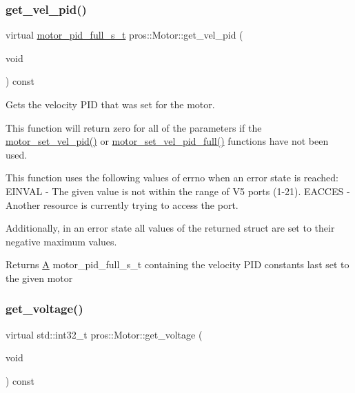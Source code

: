 \subsubsection{\texorpdfstring{get\_vel\_pid()}{get\_vel\_pid()}}
{\footnotesize\ttfamily virtual \mbox{\hyperlink{motors_8h_a0295cbf49f5c70c17b5fa962bd25febd}{motor\+\_\+pid\+\_\+full\+\_\+s\+\_\+t}} pros\+::\+Motor\+::get\+\_\+vel\+\_\+pid (\begin{DoxyParamCaption}\item[{void}]{ }\end{DoxyParamCaption}) const\hspace{0.3cm}{\ttfamily [virtual]}}



Gets the velocity P\+ID that was set for the motor. 

This function will return zero for all of the parameters if the \mbox{\hyperlink{motors_8h_a4255880d012ed0ec856f302536755d8a}{motor\+\_\+set\+\_\+vel\+\_\+pid()}} or \mbox{\hyperlink{motors_8h_acdec538d8f08e8b5946294f84f017e8e}{motor\+\_\+set\+\_\+vel\+\_\+pid\+\_\+full()}} functions have not been used.

This function uses the following values of errno when an error state is reached\+: E\+I\+N\+V\+AL -\/ The given value is not within the range of V5 ports (1-\/21). E\+A\+C\+C\+ES -\/ Another resource is currently trying to access the port.

Additionally, in an error state all values of the returned struct are set to their negative maximum values.

\begin{DoxyReturn}{Returns}
\mbox{\hyperlink{structA}{A}} motor\+\_\+pid\+\_\+full\+\_\+s\+\_\+t containing the velocity P\+ID constants last set to the given motor 
\end{DoxyReturn}
\mbox{\label{classpros_1_1Motor_abe51732c37c2ec72a8bdceac7f6962cb}} 
\subsubsection{\texorpdfstring{get\_voltage()}{get\_voltage()}}
{\footnotesize\ttfamily virtual std\+::int32\+\_\+t pros\+::\+Motor\+::get\+\_\+voltage (\begin{DoxyParamCaption}\item[{void}]{ }\end{DoxyParamCaption}) const\hspace{0.3cm}{\ttfamily [virtual]}}



